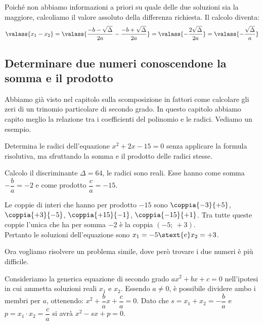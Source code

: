 Poiché non abbiamo informazioni a priori su quale delle due soluzioni sia 
la maggiore, calcoliamo il valore assoluto della differenza richiesta. 
Il calcolo diventa: 
\[
\valass{x_1 -x_2} = 
\valass{\dfrac{-b -\sqrt{\Delta}}{2 a} -\dfrac{-b +\sqrt{\Delta}}{2 a}} = 
\valass{-\dfrac{2 \sqrt{\Delta}}{2 a}} = 
\valass{-\dfrac{\sqrt{\Delta}}{a}}
\]

\subsection{Determinare due numeri conoscendone la somma e il prodotto}
Abbiamo già visto nel capitolo sulla scomposizione in fattori come 
calcolare gli zeri di un trinomio particolare di secondo grado. 
In questo capitolo abbiamo capito meglio la relazione tra i coefficienti 
del polinomio e le radici. 
Vediamo un esempio.

\begin{esempio}{}{}
Determina le radici dell'equazione \(x^2 +2 x -15 = 0\) senza applicare la 
formula risolutiva, ma sfruttando la somma e il prodotto delle radici 
stesse.

Calcolo il discriminante \(\Delta = 64\), le radici sono reali. 
Esse hanno come 
somma~\(-\dfrac{b}{a} = -2\) e come prodotto \(\dfrac{c}{a} = -15\).

Le coppie di interi che hanno per prodotto \(-15\) sono 
\(\coppia{-3}{+5}\), \(\coppia{+3}{-5}\), 
\(\coppia{+15}{-1}\), \(\coppia{-15}{+1}\).
Tra tutte queste coppie l'unica che ha per somma \(-2\) è la coppia 
\((-5;~+3)\).\\
Pertanto le soluzioni dell'equazione sono \(x_1 = -5 \stext{e} x_2 = +3\).
\end{esempio}

Ora vogliamo risolvere un problema simile, dove però trovare i due numeri 
è più difficile.

Consideriamo la generica equazione di secondo grado \(a x^2 +bx +c = 0\) 
nell'ipotesi in cui ammetta soluzioni reali \(x_1\) e \(x_2\). 
Essendo \(a \neq 0\), è possibile dividere ambo i membri per \(a\), 
ottenendo: 
\(x^2 + \dfrac{b}{a} x +\dfrac{c}{a} = 0\). 
Dato che \(s = x_1 +x_2 = -\dfrac{b}{a}\) \quad e \quad 
\(p = x_1 \cdot x_2 = \dfrac{c}{a}\) si avrà \(x^2 -s x +p = 0\).

